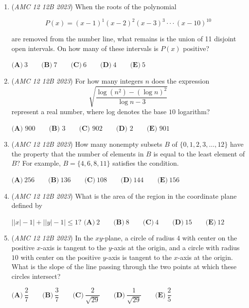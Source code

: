 \begin{enumerate}
 $\textbf{(A)}~3\qquad\textbf{(B)}~5\qquad\textbf{(C)}~4\qquad\textbf{(D)}~8\qquad\textbf{(E)}~6$


	\item (\textit{AMC 12 12B 2023}) When the roots of the polynomial


 
 \[P(x)  = (x-1)^1 (x-2)^2 (x-3)^3 \cdot \cdot \cdot (x-10)^{10}\]


 are removed from the number line, what remains is the union of 11 disjoint open intervals. On how many of these intervals is $P(x)$ positive?


 $\textbf{(A)}~3\qquad\textbf{(B)}~7\qquad\textbf{(C)}~6\qquad\textbf{(D)}~4\qquad\textbf{(E)}~5$


	\item (\textit{AMC 12 12B 2023}) For how many integers $n$ does the expression
 \[\sqrt{\frac{\log (n^2) - (\log n)^2}{\log n - 3}}\]represent a real number, where log denotes the base $10$ logarithm?


 $\textbf{(A) }900 \qquad \textbf{(B) }3\qquad \textbf{(C) }902 \qquad \textbf{(D) } 2  \qquad \textbf{(E) }901$


	\item (\textit{AMC 12 12B 2023}) How many nonempty subsets $B$ of $\{0, 1, 2, 3, \dots, 12\}$ have the property that the number of elements in $B$ is equal to the least element of $B$? For example, $B = \{4, 6, 8, 11\}$ satisfies the condition.


 $\textbf{(A)}\ 256 \qquad\textbf{(B)}\ 136 \qquad\textbf{(C)}\ 108 \qquad\textbf{(D)}\ 144 \qquad\textbf{(E)}\ 156$


	\item (\textit{AMC 12 12B 2023}) What is the area of the region in the coordinate plane defined by


 $\left||x|-1\right|+\left||y|-1\right|\leq 1?$
$\textbf{(A)}~2\qquad\textbf{(B)}~8\qquad\textbf{(C)}~4\qquad\textbf{(D)}~15\qquad\textbf{(E)}~12$


	\item (\textit{AMC 12 12B 2023}) In the $xy$-plane, a circle of radius $4$ with center on the positive $x$-axis is tangent to the $y$-axis at the origin, and a circle with radius $10$ with center on the positive $y$-axis is tangent to the $x$-axis at the origin. What is the slope of the line passing through the two points at which these circles intersect?


 $\textbf{(A)}\ \dfrac{2}{7} \qquad\textbf{(B)}\ \dfrac{3}{7}  \qquad\textbf{(C)}\ \dfrac{2}{\sqrt{29}}  \qquad\textbf{(D)}\ \dfrac{1}{\sqrt{29}}  \qquad\textbf{(E)}\ \dfrac{2}{5}$



\end{enumerate}

